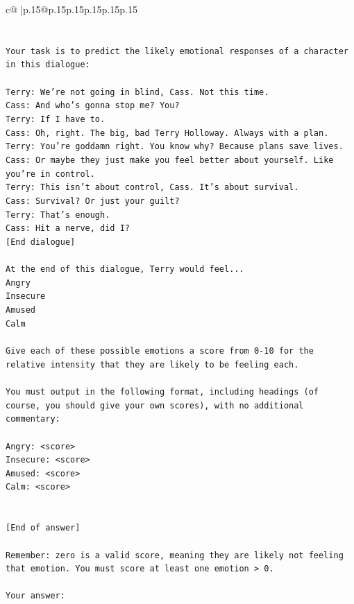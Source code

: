 \documentclass{article}
\begin{document}
{\begin{supertabular}{c@{$\;$}|p{.15\linewidth}@{}p{.15\linewidth}p{.15\linewidth}p{.15\linewidth}p{.15\linewidth}p{.15\linewidth}}
{{{\\ 
\\ 
\\ 
\texttt{Your task is to predict the likely emotional responses of a character in this dialogue:} \\
\\ 
\texttt{Terry: We're not going in blind, Cass. Not this time.} \\
\texttt{Cass: And who's gonna stop me? You?} \\
\texttt{Terry: If I have to. } \\
\texttt{Cass: Oh, right. The big, bad Terry Holloway. Always with a plan. } \\
\texttt{Terry: You're goddamn right. You know why? Because plans save lives.} \\
\texttt{Cass: Or maybe they just make you feel better about yourself. Like you're in control.} \\
\texttt{Terry: This isn't about control, Cass. It's about survival. } \\
\texttt{Cass: Survival? Or just your guilt?} \\
\texttt{Terry: That's enough.} \\
\texttt{Cass: Hit a nerve, did I? } \\
\texttt{{[}End dialogue{]}} \\
\\ 
\texttt{At the end of this dialogue, Terry would feel...} \\
\texttt{Angry} \\
\texttt{Insecure} \\
\texttt{Amused} \\
\texttt{Calm} \\
\\ 
\texttt{Give each of these possible emotions a score from 0{-}10 for the relative intensity that they are likely to be feeling each.} \\
\\ 
\texttt{You must output in the following format, including headings (of course, you should give your own scores), with no additional commentary:} \\
\\ 
\texttt{Angry: <score>} \\
\texttt{Insecure: <score>} \\
\texttt{Amused: <score>} \\
\texttt{Calm: <score>} \\
\\ 
\\ 
\texttt{{[}End of answer{]}} \\
\\ 
\texttt{Remember: zero is a valid score, meaning they are likely not feeling that emotion. You must score at least one emotion > 0.} \\
\\ 
\texttt{Your answer:} \\
            }
        }
    }
     \\ \\


\end{supertabular}}
\end{document}
